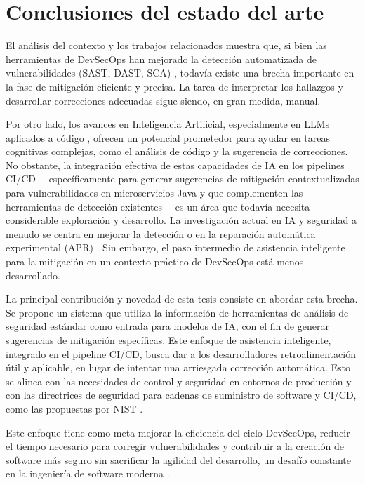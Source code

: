 \section{Conclusiones del estado del arte}\label{sec:conclusionesSOTA}
El análisis del contexto y los trabajos relacionados muestra que, si bien las herramientas de DevSecOps han mejorado la detección automatizada de vulnerabilidades (SAST, DAST, SCA) \cite{Kumar2022DevSecOpsReview, SonarSourceDocSonarQube, SnykDoc}, todavía existe una brecha importante en la fase de mitigación eficiente y precisa. La tarea de interpretar los hallazgos y desarrollar correcciones adecuadas sigue siendo, en gran medida, manual.

Por otro lado, los avances en Inteligencia Artificial, especialmente en LLMs aplicados a código \cite{GitHubCopilotFeatures, Wang2022CopilotSecurity}, ofrecen un potencial prometedor para ayudar en tareas cognitivas complejas, como el análisis de código y la sugerencia de correcciones. No obstante, la integración efectiva de estas capacidades de IA en los pipelines CI/CD —específicamente para generar sugerencias de mitigación contextualizadas para vulnerabilidades en microservicios Java y que complementen las herramientas de detección existentes— es un área que todavía necesita considerable exploración y desarrollo. La investigación actual en IA y seguridad a menudo se centra en mejorar la detección \cite{GitHubAICodeReviews} o en la reparación automática experimental (APR) \cite{Liu2024APRSurvey}. Sin embargo, el paso intermedio de asistencia inteligente para la mitigación en un contexto práctico de DevSecOps está menos desarrollado.

La principal contribución y novedad de esta tesis consiste en abordar esta brecha. Se propone un sistema que utiliza la información de herramientas de análisis de seguridad estándar como entrada para modelos de IA, con el fin de generar sugerencias de mitigación específicas. Este enfoque de asistencia inteligente, integrado en el pipeline CI/CD, busca dar a los desarrolladores retroalimentación útil y aplicable, en lugar de intentar una arriesgada corrección automática. Esto se alinea con las necesidades de control y seguridad en entornos de producción y con las directrices de seguridad para cadenas de suministro de software y CI/CD, como las propuestas por NIST \cite{NIST2024CICDSecurity}.

Este enfoque tiene como meta mejorar la eficiencia del ciclo DevSecOps, reducir el tiempo necesario para corregir vulnerabilidades y contribuir a la creación de software más seguro sin sacrificar la agilidad del desarrollo, un desafío constante en la ingeniería de software moderna \cite{Laukkanen2017BenefitsChallengesCICD, Myrbakken2019DevSecOpsSLR}.